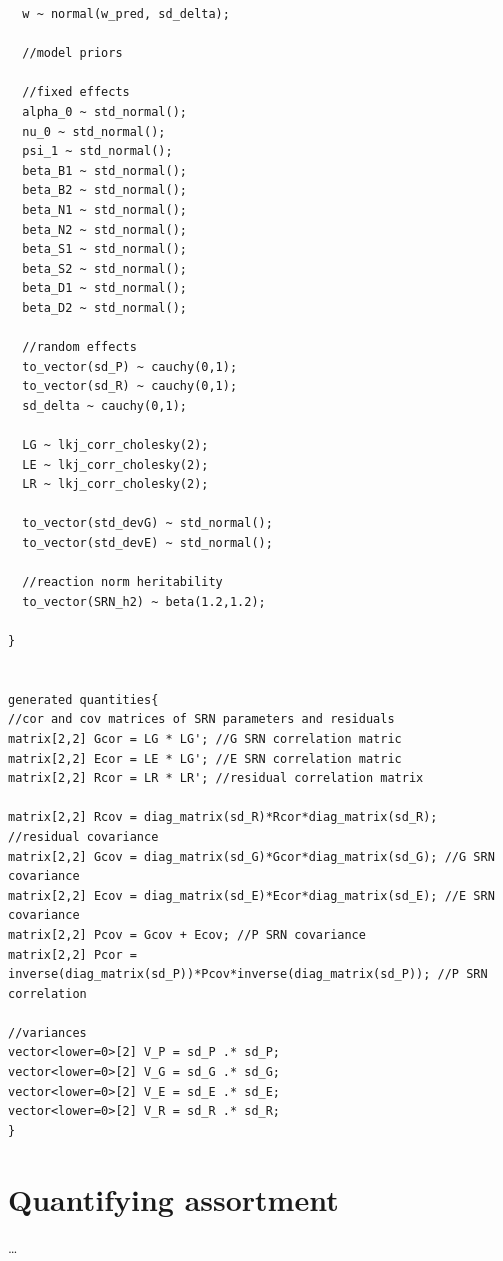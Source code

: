 \documentclass[
]{book}
\begin{document}
\begin{verbatim}
  w ~ normal(w_pred, sd_delta);

  //model priors
  
  //fixed effects
  alpha_0 ~ std_normal();
  nu_0 ~ std_normal();
  psi_1 ~ std_normal();
  beta_B1 ~ std_normal();
  beta_B2 ~ std_normal();
  beta_N1 ~ std_normal();
  beta_N2 ~ std_normal();
  beta_S1 ~ std_normal();
  beta_S2 ~ std_normal();
  beta_D1 ~ std_normal();
  beta_D2 ~ std_normal();
  
  //random effects
  to_vector(sd_P) ~ cauchy(0,1);
  to_vector(sd_R) ~ cauchy(0,1);
  sd_delta ~ cauchy(0,1);
  
  LG ~ lkj_corr_cholesky(2);
  LE ~ lkj_corr_cholesky(2);
  LR ~ lkj_corr_cholesky(2);
  
  to_vector(std_devG) ~ std_normal();
  to_vector(std_devE) ~ std_normal();
  
  //reaction norm heritability
  to_vector(SRN_h2) ~ beta(1.2,1.2);
  
}


generated quantities{
//cor and cov matrices of SRN parameters and residuals
matrix[2,2] Gcor = LG * LG'; //G SRN correlation matric
matrix[2,2] Ecor = LE * LG'; //E SRN correlation matric
matrix[2,2] Rcor = LR * LR'; //residual correlation matrix

matrix[2,2] Rcov = diag_matrix(sd_R)*Rcor*diag_matrix(sd_R); //residual covariance
matrix[2,2] Gcov = diag_matrix(sd_G)*Gcor*diag_matrix(sd_G); //G SRN covariance
matrix[2,2] Ecov = diag_matrix(sd_E)*Ecor*diag_matrix(sd_E); //E SRN covariance
matrix[2,2] Pcov = Gcov + Ecov; //P SRN covariance
matrix[2,2] Pcor = inverse(diag_matrix(sd_P))*Pcov*inverse(diag_matrix(sd_P)); //P SRN correlation

//variances
vector<lower=0>[2] V_P = sd_P .* sd_P;
vector<lower=0>[2] V_G = sd_G .* sd_G;
vector<lower=0>[2] V_E = sd_E .* sd_E;
vector<lower=0>[2] V_R = sd_R .* sd_R;
}
\end{verbatim}

\hypertarget{quantifying-assortment}{%
\section{Quantifying assortment}\label{quantifying-assortment}}

\ldots{}
\end{document}
